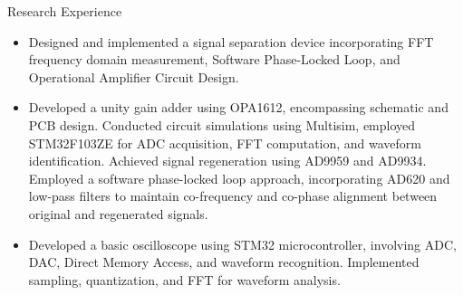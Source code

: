 \documentclass{resume} %
\begin{document}
\begin{workSection}{Research Experience}

    \experienceItem[
        company=TI Cup National Undergraduate Electronics Design Contest,
        location=Jinan,
        position=Signal Separation Device,
        duration=August 2023
    ]
    \begin{itemize}
        \itemsep -6pt
        \item Designed and implemented a signal separation device incorporating FFT frequency domain measurement, Software Phase-Locked Loop, and Operational Amplifier Circuit Design.
        \item Developed a unity gain adder using OPA1612, encompassing schematic and PCB design. Conducted circuit simulations using Multisim, employed STM32F103ZE for ADC acquisition, FFT computation, and waveform identification. Achieved signal regeneration using AD9959 and AD9934. Employed a software phase-locked loop approach, incorporating AD620 and low-pass filters to maintain co-frequency and co-phase alignment between original and regenerated signals.
    \end{itemize}
    
    \experienceItem[
        company=Lichuang Cup SDUST Electronic Design Competition,
        location=Qingdao,
        position=Basic Oscilloscope and Signal Generator,
        duration=April 2023
    ]
    \begin{itemize}
        \itemsep -6pt
        \item Developed a basic oscilloscope using STM32 microcontroller, involving ADC, DAC, Direct Memory Access, and waveform recognition. Implemented sampling, quantization, and FFT for waveform analysis.
    \end{itemize}

\end{workSection}
\end{document}
